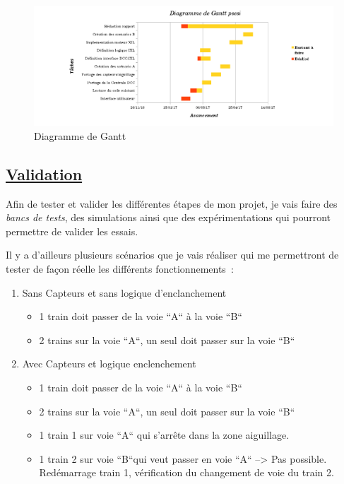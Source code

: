 \begin{figure}[h]
\centering
\includegraphics[scale=0.5]{gantt.png}
\caption{Diagramme de Gantt}
\label{gantt}
\end{figure}



\subsection{\underline{Validation}}
\label{sec:valid}

Afin de tester et valider les diff\'erentes \'etapes de mon projet, je vais
faire des \emph{bancs de tests}, des simulations ainsi que des
exp\'erimentations qui pourront permettre de valider les essais.

Il y a d'ailleurs plusieurs sc\'enarios que je vais r\'ealiser qui
me permettront de tester de façon r\'eelle les différents fonctionnements~:


\begin{enumerate}[A]
  \item Sans Capteurs et sans logique d'enclanchement
  \begin{itemize}
    \item 1 train doit passer de la voie ``A`` à la voie ``B``
    \item 2 trains sur la voie ``A``, un seul doit passer sur la voie
       ``B``
  \end{itemize}

\newpage
  
  \item Avec Capteurs et logique enclenchement
  \begin{itemize}
    \item 1 train doit passer de la voie ``A`` à la voie ``B``
    \item 2 trains sur la voie ``A``, un seul doit passer sur la voie ``B``
    \item 1 train 1 sur voie ``A`` qui s'arrête dans la zone aiguillage.
    \item 1 train 2 sur voie ``B``qui veut passer en voie ``A`` --> Pas
       possible. Red\'emarrage train 1, v\'erification du changement de
       voie du train 2.
  \end{itemize}
\end{enumerate}

